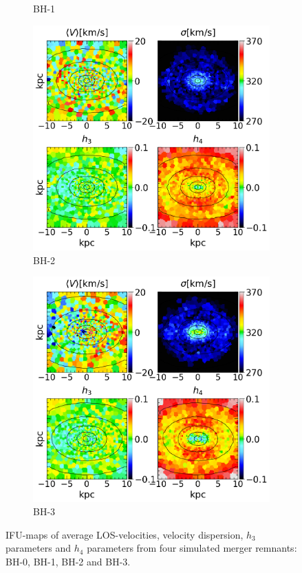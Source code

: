 \documentclass[english, oneside]{HYgradu}
\begin{document}
\begin{figure}
\begin{subfigure}[b]{0.49\textwidth}
		\caption{BH-1}
	\end{subfigure}
	\begin{subfigure}[b]{0.49\textwidth}
		\includegraphics[width=\textwidth]{BH_2.png}
		\caption{BH-2}
	\end{subfigure}
	\begin{subfigure}[b]{0.49\textwidth}
		\includegraphics[width=\textwidth]{BH_3.png}
		\caption{BH-3}
	\end{subfigure}
	\caption{IFU-maps of average LOS-velocities, velocity dispersion, $h_3$ parameters and $h_4$ parameters from four simulated merger remnants: BH-0, BH-1, BH-2 and BH-3.}
\end{figure}
\end{document}
